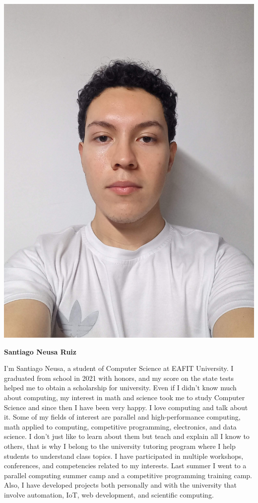 \documentclass[11pt,a4paper,twocolumn]{article}
\begin{document}
    \begin{center}
        \includegraphics[width = .45\linewidth]{Images/Santiago Neusa.jpeg}
    \end{center}
    \begin{center}
        \textbf{Santiago Neusa Ruiz}
        \bigskip
    \end{center}
    I'm Santiago Neusa, a student of Computer Science at EAFIT University. I graduated from school in 2021 with honors, and my score on the state tests helped me to obtain a scholarship for university. Even if I didn't know much about computing, my interest in math and science took me to study Computer Science and since then I have been very happy. I love computing and talk about it. Some of my fields of interest are parallel and high-performance computing, math applied to computing, competitive programming, electronics, and data science. I don't just like to learn about them but teach and explain all I know to others, that is why I belong to the university tutoring program where I help students to understand class topics. I have participated in multiple workshops, conferences, and competencies related to my interests. Last summer I went to a parallel computing summer camp and a competitive programming training camp. Also, I have developed projects both personally and with the university that involve automation, IoT, web development, and scientific computing.
\end{document}
